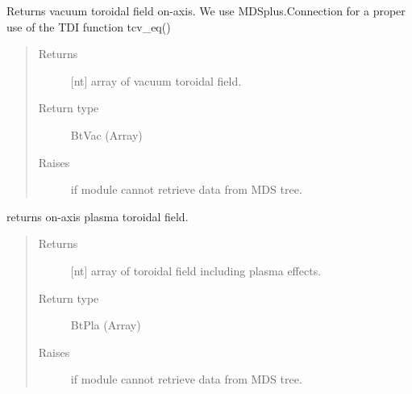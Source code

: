 \documentclass[letterpaper,10pt,english]{sphinxmanual}
\begin{document}
\begin{fulllineitems}

\begin{fulllineitems}
\label{\detokenize{eqtools:eqtools.TCVLIUQE.TCVLIUQETree.getBtVac}}
Returns vacuum toroidal field on-axis. We use MDSplus.Connection
for a proper use of the TDI function tcv\_eq()
\begin{quote}\begin{description}
\item[{Returns}] \leavevmode
{[}nt{]} array of vacuum toroidal field.

\item[{Return type}] \leavevmode
BtVac (Array)

\item[{Raises}] \leavevmode
{} \textendash{} if module cannot retrieve data from MDS tree.

\end{description}\end{quote}

\end{fulllineitems}


\begin{fulllineitems}
\label{\detokenize{eqtools:eqtools.TCVLIUQE.TCVLIUQETree.getBtPla}}
returns on-axis plasma toroidal field.
\begin{quote}\begin{description}
\item[{Returns}] \leavevmode
{[}nt{]} array of toroidal field including plasma effects.

\item[{Return type}] \leavevmode
BtPla (Array)

\item[{Raises}] \leavevmode
{} \textendash{} if module cannot retrieve data from MDS tree.

\end{description}\end{quote}

\end{fulllineitems}


\end{fulllineitems}
\end{document}
